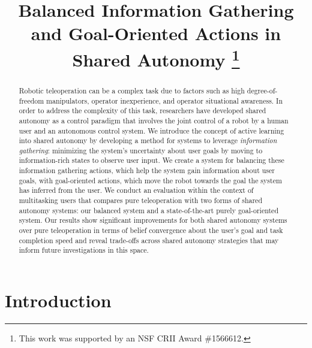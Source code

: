 \documentclass[conference]{IEEEtran}
\begin{document}
\title{Balanced Information Gathering and Goal-Oriented Actions in Shared Autonomy
\thanks{This work was supported by an NSF CRII Award \#1566612.}
}

\author{
\and
{}
}
\maketitle

\begin{abstract}
Robotic teleoperation can be a complex task due to factors such as high degree-of-freedom manipulators, operator inexperience, and operator situational awareness. In order to address the complexity of this task, researchers have developed shared autonomy as a control paradigm that involves the joint control of a robot by a human user and an autonomous control system. We introduce the concept of active learning into shared autonomy by developing a method for systems to leverage \textit{information gathering}: minimizing the system's uncertainty about user goals by moving to information-rich states to observe user input. We create a system for balancing these information gathering actions, which help the system gain information about user goals, with goal-oriented actions, which move the robot towards the goal the system has inferred from the user. We conduct an evaluation within the context of multitasking users that compares pure teleoperation with two forms of shared autonomy systems: our balanced system and a state-of-the-art purely goal-oriented system. Our results show significant improvements for both shared autonomy systems over pure teleoperation in terms of belief convergence about the user's goal and task completion speed and reveal trade-offs across shared autonomy strategies that may inform future investigations in this space.
\end{abstract}

\section{Introduction}
\end{document}
